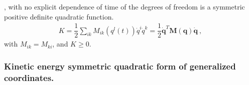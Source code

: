 \documentclass[letterpaper,10pt,english]{jupyterBook}
\begin{document}
\sphinxAtStartPar
{} 

\sphinxAtStartPar
{}, with no explicit dependence of time of the degrees of freedom is a symmetric positive definite quadratic function.
\begin{equation*}
\begin{split}K = \dfrac{1}{2} \sum_{ik} M_{ik}\left(q^l(t)\right) \dot{q}^i \dot{q}^k = \dfrac{1}{2} \dot{\mathbf{q}}^T \mathbf{M}(\mathbf{q}) \dot{\mathbf{q}} \ ,\end{split}
\end{equation*}
\sphinxAtStartPar
with \(M_{ik} = M_{ki}\), and \(K \ge 0\).
\subsubsection*{Kinetic energy symmetric quadratic form of generalized coordinates.}
\end{document}
